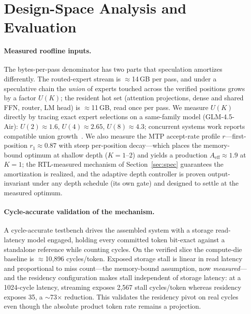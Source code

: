 \documentclass[11pt]{article}
\begin{document}
\section{Design-Space Analysis and Evaluation}
\label{sec:analysis}

\paragraph{Measured roofline inputs.} The bytes-per-pass denominator has two
parts that speculation amortizes differently. The routed-expert stream is
$\approx$14\,GB per pass, and under a speculative chain the \emph{union} of
experts touched across the verified positions grows by a factor $U(K)$; the
resident hot set (attention projections, dense and shared FFN, router, LM head)
is $\approx$11\,GB, read once per pass. We measure $U(K)$ directly by tracing
exact expert selections on a same-family model (GLM-4.5-Air):
$U(2){\approx}1.6$, $U(4){\approx}2.65$, $U(8){\approx}4.3$; concurrent
systems work reports compatible union growth~\cite{cascade}. We also measure
the MTP accept-rate profile $r$---first-position $r_1{\approx}0.87$ with steep
per-position decay---which places the memory-bound optimum at shallow depth
($K{=}1$--$2$) and yields a production $A_{\mathrm{eff}}{\approx}1.9$ at
$K{=}1$; the RTL-measured
mechanism of Section~\ref{sec:spec} guarantees the amortization is realized,
and the adaptive depth controller is proven output-invariant under any depth
schedule (its own gate) and designed to settle at the measured optimum.

\paragraph{Cycle-accurate validation of the mechanism.} A cycle-accurate
testbench drives the assembled system with a storage read-latency model
engaged, holding every committed token bit-exact against a standalone reference
while counting cycles. On the verified slice the compute-die baseline is
$\approx$10{,}896 cycles/token. Exposed storage stall is linear in read latency
and proportional to miss count---the memory-bound assumption, now
\emph{measured}---and the residency configuration makes stall independent of
storage latency: at a 1024-cycle latency, streaming exposes 2{,}567 stall
cycles/token whereas residency exposes 35, a $\sim$73$\times$ reduction. This
validates the residency pivot on real cycles even though the absolute product
token rate remains a projection.
\end{document}
